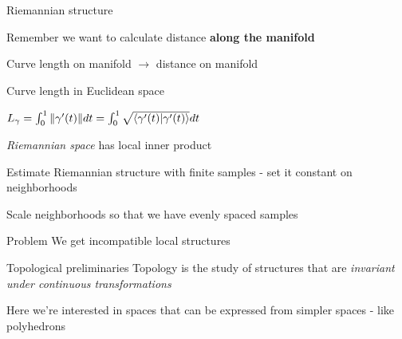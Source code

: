 \documentclass[unknownkeysallowed]{beamer}
\begin{document}
\begin{frame}{Riemannian structure}

Remember we want to calculate distance \textbf{along the manifold} 

Curve length on manifold $\to$ distance on manifold

\begin{block}{Curve length in Euclidean space}

$L_\gamma = \int_{0}^{1} \|\gamma'(t)\| dt =  \int_{0}^{1} \sqrt{\braket{\gamma'(t) | \gamma'(t)}} dt$

\end{block}

\textit{Riemannian space} has local inner product

Estimate Riemannian structure with finite samples - set it constant on neighborhoods

Scale neighborhoods so that we have evenly spaced samples

\begin{alertblock}{Problem}
We get incompatible local structures
\end{alertblock}
\end{frame}



\begin{frame}{Topological preliminaries}
Topology is the study of structures that are \textit{invariant under continuous transformations}

Here we're interested in spaces that can be expressed from simpler spaces - like polyhedrons

\end{frame}
\end{document}
